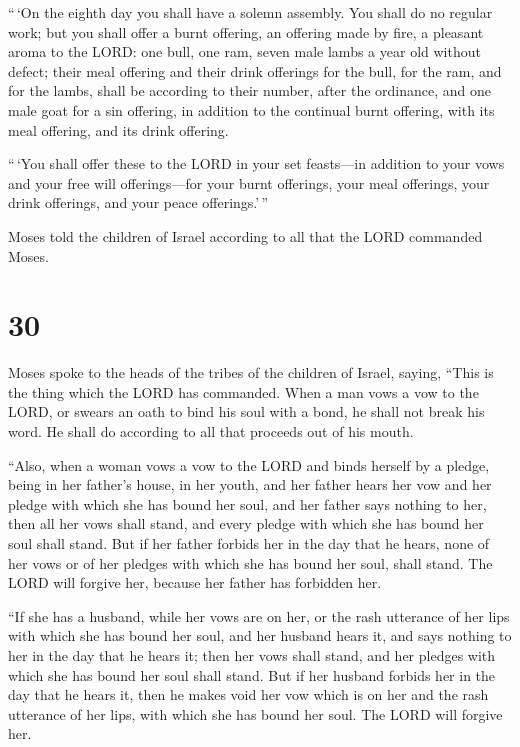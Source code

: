  ``\,`On the eighth day you shall have a solemn assembly.
You shall do no regular work;  but you shall offer a burnt
offering, an offering made by fire, a pleasant aroma to the LORD: one
bull, one ram, seven male lambs a year old without defect; 
their meal offering and their drink offerings for the bull, for the ram,
and for the lambs, shall be according to their number, after the
ordinance,  and one male goat for a sin offering, in
addition to the continual burnt offering, with its meal offering, and
its drink offering.

 ``\,`You shall offer these to the LORD in your set
feasts---in addition to your vows and your free will offerings---for
your burnt offerings, your meal offerings, your drink offerings, and
your peace offerings.'\,''

 Moses told the children of Israel according to all that
the LORD commanded Moses.

\hypertarget{section-29}{%
\section{30}\label{section-29}}

 Moses spoke to the heads of the tribes of the children of
Israel, saying, ``This is the thing which the LORD has commanded.
 When a man vows a vow to the LORD, or swears an oath to
bind his soul with a bond, he shall not break his word. He shall do
according to all that proceeds out of his mouth.

 ``Also, when a woman vows a vow to the LORD and binds
herself by a pledge, being in her father's house, in her youth,
 and her father hears her vow and her pledge with which she
has bound her soul, and her father says nothing to her, then all her
vows shall stand, and every pledge with which she has bound her soul
shall stand.  But if her father forbids her in the day that
he hears, none of her vows or of her pledges with which she has bound
her soul, shall stand. The LORD will forgive her, because her father has
forbidden her.

 ``If she has a husband, while her vows are on her, or the
rash utterance of her lips with which she has bound her soul,
 and her husband hears it, and says nothing to her in the
day that he hears it; then her vows shall stand, and her pledges with
which she has bound her soul shall stand.  But if her
husband forbids her in the day that he hears it, then he makes void her
vow which is on her and the rash utterance of her lips, with which she
has bound her soul. The LORD will forgive her.

